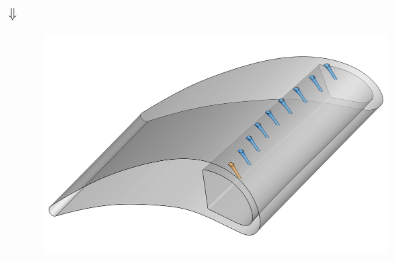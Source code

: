 \documentclass[8pt, aspectratio=169]{beamer}
\begin{document}
\begin{frame}
\begin{minipage}[t]{0.35\textwidth}
\begin{figure}[H]
\begin{subfigure}{0.8\textwidth}
			\end{subfigure}\\
			$\Downarrow$\\
			\begin{subfigure}{0.8\textwidth}
				\includegraphics[width=\textwidth]{../../tec/holes/22edit.png}
			\end{subfigure}
		\end{figure}
	\end{minipage}
	\vfill
\end{frame}
\end{document}
